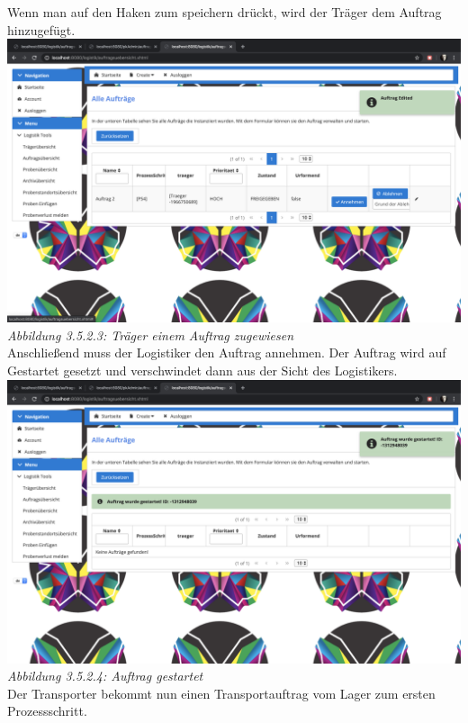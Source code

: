 \documentclass[enabledeprecatedfontcommands,fontsize=12pt,paper=a4,twoside]{scrartcl}
\begin{document}
Wenn man auf den Haken zum speichern drückt, wird der Träger dem Auftrag hinzugefügt. \\

 \hypertarget{sc3.5.2.3}{
\includegraphics[width=1\textwidth]{Screenshots/3523.png}
\textit{Abbildung 3.5.2.3: Träger einem Auftrag zugewiesen}
} \\

Anschließend muss der Logistiker den Auftrag annehmen. Der Auftrag wird auf Gestartet gesetzt und verschwindet dann aus der Sicht des Logistikers. \\ 

 \hypertarget{sc3.5.2.4}{
\includegraphics[width=1\textwidth]{Screenshots/3524.png}
\textit{Abbildung 3.5.2.4: Auftrag gestartet}
} \\

Der Transporter bekommt nun einen Transportauftrag vom Lager zum ersten Prozessschritt. \\
\end{document}
